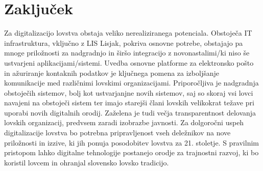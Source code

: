 \documentclass[a4paper,12pt,openright]{book}
\begin{document}
\chapter{Zaključek}  

Za digitalizacijo lovstva obstaja veliko nerealiziranega potenciala.
Obstoječa IT infrastruktura, vključno z LIS Lisjak, pokriva osnovne potrebe, obstajajo pa mnoge priložnosti za nadgradnjo in širšo integracijo z novonastalimi/ki niso še ustvarjeni aplikacijami/sistemi.
Uvedba osnovne platforme za elektronsko pošto in ažuriranje kontaknih podatkov je ključnega pomena za izboljšanje komunikacije med različnimi lovskimi organizacijami.
Priporočljiva je nadgradnja obstoječih sistemov, bolj kot ustvarjanjne novih sistemov, saj so skoraj vsi lovci navajeni na obstoječi sistem ter imajo starejši člani lovskih velikokrat težave pri uporabi novih digitalnih orodij.
Zaželena je tudi večja transparentnost delovanja lovskih organizacij, predvsem zaradi izobrazbe javnosti.
Za dolgoročni uspeh digitalizacije lovstva bo potrebna pripravljenost vseh deležnikov na nove priložnosti in izzive, ki jih ponuja posodobitev lovstva za 21. stoletje.
S pravilnim pristopom lahko digitalne tehnologije postanejo orodje za trajnostni razvoj, ki bo koristil lovcem in ohranjal slovensko lovsko tradicijo.


\label{end}


\cleardoublepage


\printbibliography[heading=bibintoc]
\end{document}
